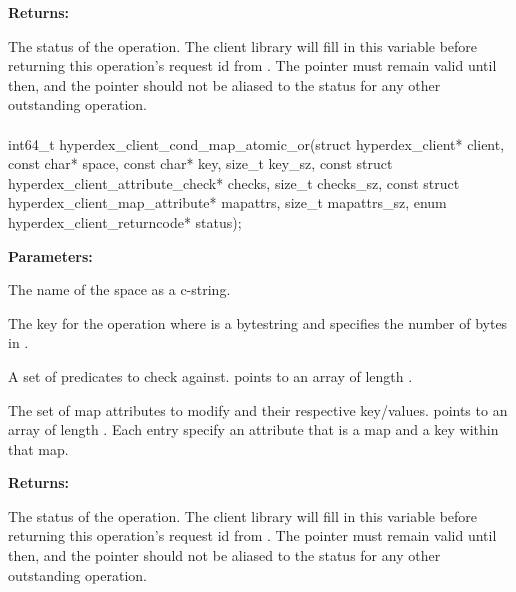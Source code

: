 \noindent\textbf{Returns:}
\begin{description}[labelindent=\widthof{{\code{status}}},leftmargin=*,noitemsep,nolistsep,align=right]
\item[\code{status}] The status of the operation.  The client library will fill in this variable before returning this operation's request id from .  The pointer must remain valid until then, and the pointer should not be aliased to the status for any other outstanding operation.
\end{description}

\paragraph{}
\begin{ccode}
int64_t hyperdex_client_cond_map_atomic_or(struct hyperdex_client* client,
                const char* space,
                const char* key, size_t key_sz,
                const struct hyperdex_client_attribute_check* checks, size_t checks_sz,
                const struct hyperdex_client_map_attribute* mapattrs, size_t mapattrs_sz,
                enum hyperdex_client_returncode* status);
\end{ccode}
\funcdesc 

\noindent\textbf{Parameters:}
\begin{description}[labelindent=\widthof{{\code{mapattrs}, \code{mapattrs\_sz}}},leftmargin=*,noitemsep,nolistsep,align=right]
\item[\code{space}] The name of the space as a c-string.
\item[\code{key}, \code{key\_sz}] The key for the operation where  is a bytestring and  specifies the number of bytes in .
\item[\code{checks}, \code{checks\_sz}] A set of predicates to check against.   points to an array of length .
\item[\code{mapattrs}, \code{mapattrs\_sz}] The set of map attributes to modify and their respective key/values.   points to an array of length .  Each entry specify an attribute that is a map and a key within that map.
\end{description}

\noindent\textbf{Returns:}
\begin{description}[labelindent=\widthof{{\code{status}}},leftmargin=*,noitemsep,nolistsep,align=right]
\item[\code{status}] The status of the operation.  The client library will fill in this variable before returning this operation's request id from .  The pointer must remain valid until then, and the pointer should not be aliased to the status for any other outstanding operation.
\end{description}

